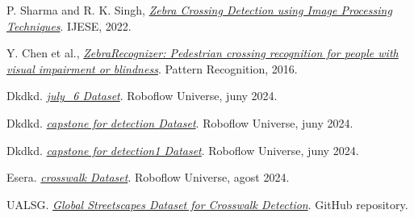 \documentclass[10pt,a4paper,twocolumn,twoside]{article}
\begin{document}
\begin{thebibliography}{9}
	P. Sharma and R. K. Singh, \textit{\href{https://www.ijese.org/wp-content/uploads/Papers/v13i3/B104214020125.pdf}{Zebra Crossing Detection using Image Processing Techniques}}. IJESE, 2022.
	
	Y. Chen et al., \textit{\href{https://www.sciencedirect.com/science/article/abs/pii/S0031320316300826}{ZebraRecognizer: Pedestrian crossing recognition for people with visual impairment or blindness}}. Pattern Recognition, 2016.
	
	
	Dkdkd. \href{https://universe.roboflow.com/dkdkd/july_6}{\textit{july\_6 Dataset}}. Roboflow Universe, juny 2024.
	
	Dkdkd. \href{https://universe.roboflow.com/dkdkd/capstone-for-detection}{\textit{capstone for detection Dataset}}. Roboflow Universe, juny 2024.
	
	Dkdkd. \href{https://universe.roboflow.com/dkdkd/capstone-for-detection1}{\textit{capstone for detection1 Dataset}}. Roboflow Universe, juny 2024.
	
	Esera. \href{https://universe.roboflow.com/esera/crosswalk-cz3sx}{\textit{crosswalk Dataset}}. Roboflow Universe, agost 2024.
	
	UALSG. \href{https://github.com/ualsg/global-streetscapes}{\textit{Global Streetscapes Dataset for Crosswalk Detection}}. GitHub repository.
	
	
	
\end{thebibliography}
\end{document}

